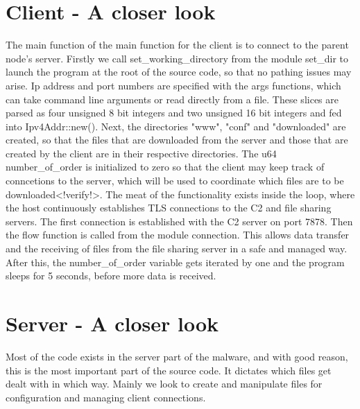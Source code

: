 \documentclass[../main.tex]{subfiles}
\begin{document}
	\vspace{10pt}
	\section{Client - A closer look}


The main function of the main function for the client is to connect to the parent node's server.
Firstly we call set_working_directory from the module set_dir to launch the program at the root of the source code, so that no pathing issues may arise.
Ip address and port numbers are specified with the args functions, which can take command line arguments or read directly from a file. These slices are parsed as four unsigned 8 bit
integers and two unsigned 16 bit integers and fed into Ipv4Addr::new(). Next, the directories "www", "conf" and "downloaded" are created, so that the files that are downloaded from 
the server and those that are created by the client are in their respective directories. The u64 number_of_order is initialized to zero so that the client may keep track of conncetions
to the server, which will be used to coordinate which files are to be downloaded<!verify!>. The meat of the functionality exists inside the loop, where the host continuously
establishes TLS connections to the C2 and file sharing servers. The first connection is established with the C2 server on port 7878. Then the flow function is 
called from the module connection. This allows data transfer and the receiving of files from the file sharing server in a safe and managed way. After this, the number_of_order variable
gets iterated by one and the program sleeps for 5 seconds, before more data is received.
	\vspace{10pt}

	\section{Server -  A closer look}


Most of the code exists in the server part of the malware, and with good reason, this is the most important part of the source code. It dictates which files get dealt with in which way.
Mainly we look to create and manipulate files for configuration and managing client connections.
\end{document}
